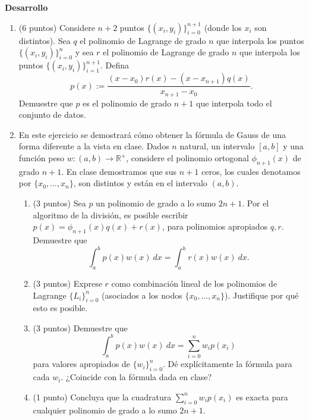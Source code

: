 \documentclass[12pt,final,twoside,notitlepage]{article}
\begin{document}
\textbf{Desarrollo}
\begin{enumerate}
\item (6 puntos) Considere $n+2$ puntos $\lbrace (x_i,y_i)\rbrace_{i=0}^{n+1}$ (donde los $x_i$ son distintos). Sea $q$ el polinomio de Lagrange de grado $n$ que interpola los puntos $\lbrace (x_i,y_i)\rbrace_{i=0}^{n}$ y sea $r$ el polinomio de Lagrange de grado $n$ que interpola los puntos $\lbrace (x_i,y_i)\rbrace_{i=1}^{n+1}$. Defina $$p(x):=\dfrac{(x-x_0)r(x)-(x-x_{n+1})q(x)}{x_{n+1}-x_0}.$$ Demuestre que $p$ es el polinomio de grado $n+1$ que interpola todo el conjunto de datos.

\item En este ejercicio se demostrará cómo obtener la fórmula de Gauss de una forma diferente a la vista en clase. Dados $n$ natural, un intervalo $[a,b]$ y una función peso $w:(a,b)\to \mathbb{R}^+$, considere el polinomio ortogonal $\phi_{n+1}(x)$ de grado $n+1$. En clase demostramos que sus $n+1$ ceros, los cuales denotamos por $\{x_0,\ldots,x_n\}$, son distintos y están en el intervalo $(a,b)$. %
\begin{enumerate}
    \item (3 puntos) Sea $p$ un polinomio de grado a lo sumo $2n+1$. Por el algoritmo de la división, es posible escribir $p(x)=\phi_{n+1}(x)q(x)+r(x)$, para polinomios apropiados $q, r$. Demuestre que $$\int_a^b p(x)w(x)\ dx = \int_a^b r(x)w(x)\ dx.$$
    \item (3 puntos) Exprese $r$ como combinación lineal de los polinomios de Lagrange $\{ L_i\}_{i=0}^n$ (asociados a los nodos $\{x_0,\ldots,x_n\}$). Justifique por qué esto es posible.
    \item (3 puntos) Demuestre que $$\int_a^b p(x)w(x)\ dx = \sum_{i=0}^n w_i p(x_i)$$ para valores apropiados de $\{w_i\}_{i=0}^n$. Dé explícitamente la fórmula para cada $w_i$. ¿Coincide con la fórmula dada en clase?
    \item (1 punto) Concluya que la cuadratura $\displaystyle\sum_{i=0}^n w_i p(x_i)$ es exacta para cualquier polinomio de grado a lo sumo $2n+1$.
\end{enumerate}


\end{enumerate}
\end{document}
